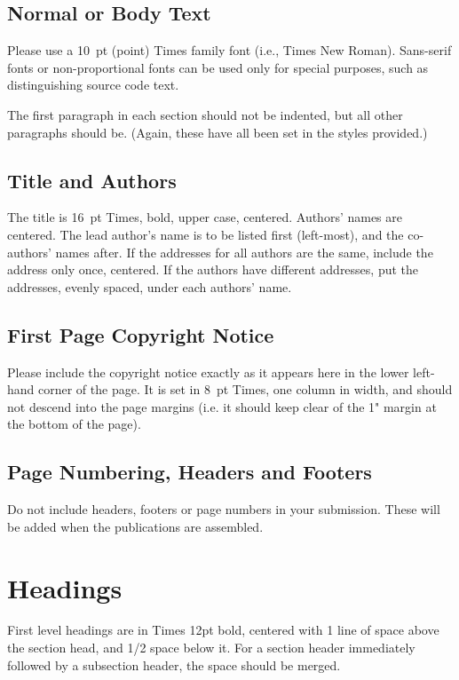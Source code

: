\documentclass{article}
\begin{document}
\subsection{Normal or Body Text}\label{subsec:body}
Please use a 10~pt (point) Times family font (i.e., Times New Roman). Sans-serif fonts or non-proportional fonts can be used only for special purposes, such as distinguishing source code text.

The first paragraph in each section should not be indented, but all other paragraphs should be. (Again, these have all been set in the styles provided.)


\subsection{Title and Authors}
The title is 16~pt Times, bold, upper case, centered. Authors' names are centered. The lead author's name is to be listed first (left-most), and the co-authors' names after. If the addresses for all authors are the same, include the address only once, centered. If the authors have different addresses, put the addresses, evenly spaced, under each authors' name.

\subsection{First Page Copyright Notice}
Please include the copyright notice exactly as it appears here in the lower left-hand corner of the page. It is set in 8~pt Times, one column in width, and should not descend into the  page margins (i.e. it should keep clear of the 1" margin at the bottom of the page).

\subsection{Page Numbering, Headers and Footers}
Do not include headers, footers or page numbers in your submission. These will be added when the publications are assembled.

\section{Headings}
First level headings are in Times 12pt bold, centered with 1 line of space above the section head, and 1/2 space below it.  For a section header immediately followed by a subsection header, the space should be merged.
\end{document}
